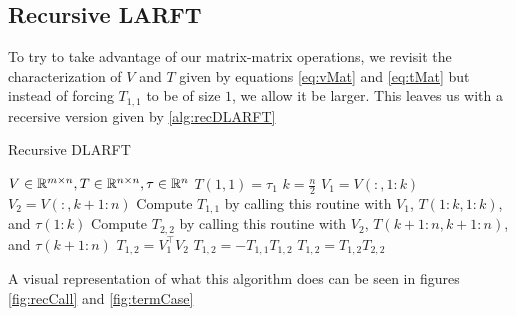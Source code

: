 \documentclass[12pt]{article}
\begin{document}
    \subsection{Recursive LARFT}
    To try to take advantage of our matrix-matrix operations, we revisit the characterization of $V$ and $T$
    given by equations \ref{eq:vMat} and \ref{eq:tMat} but instead of forcing $T_{1,1}$ to be of size $1$, we 
    allow it be larger. This leaves us with a recersive version given by \ref{alg:recDLARFT}
    
    \begin{algorithm}
        \caption{Recursive DLARFT}\label{alg:recDLARFT}
        \begin{algorithmic}[1]
            \REQUIRE $V\in\mathbb{R}^{m\times n}, T\in\mathbb{R}^{n\times n}, \tau\in\mathbb{R}^n$\hfill{}
                \STATE $T(1,1) = \tau_1$
                \RETURN
            \ENDIF
            \STATE $k = \frac{n}{2}$\hfill{}
            \STATE $V_1 = V(:,1:k)$
            \STATE $V_2 = V(:,k+1:n)$
            \STATE Compute $T_{1,1}$ by calling this routine with $V_1$, $T(1:k,1:k)$, and $\tau(1:k)$
            \STATE Compute $T_{2,2}$ by calling this routine with $V_2$, $T(k+1:n,k+1:n)$, and $\tau(k+1:n)$
            \STATE $T_{1,2} = V_1^\top V_2$
            \STATE $T_{1,2} = -T_{1,1}T_{1,2}$
            \STATE $T_{1,2} = T_{1,2}T_{2,2}$
            \RETURN
        \end{algorithmic}
    \end{algorithm}

    A visual representation of what this algorithm does can be seen in figures \ref{fig:recCall} and \ref{fig:termCase}
\end{document}
